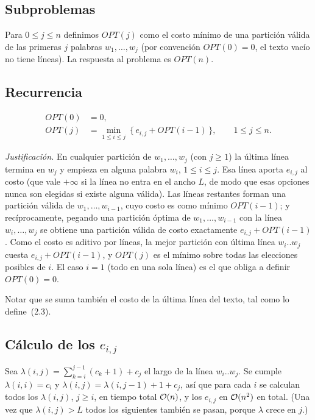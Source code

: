 \subsection*{Subproblemas}

Para $0\le j\le n$ definimos $OPT(j)$ como el costo mínimo de una partición válida de las primeras $j$ palabras $w_1,\dots,w_j$ (por convención $OPT(0)=0$, el texto vacío no tiene líneas). La respuesta al problema es $OPT(n)$.

\subsection*{Recurrencia}

\begin{align}
OPT(0) &= 0, \label{e2:b}\\
OPT(j) &= \min_{1\le i\le j}\ \bigl\{\, e_{i,j} + OPT(i-1) \,\bigr\}, \qquad 1\le j\le n. \label{e2:rec}
\end{align}

\emph{Justificación.} En cualquier partición de $w_1,\dots,w_j$ (con $j\ge 1$) la última línea termina en $w_j$ y empieza en alguna palabra $w_i$, $1\le i\le j$. Esa línea aporta $e_{i,j}$ al costo (que vale $+\infty$ si la línea no entra en el ancho $L$, de modo que esas opciones nunca son elegidas si existe alguna válida). Las líneas restantes forman una partición válida de $w_1,\dots,w_{i-1}$, cuyo costo es como mínimo $OPT(i-1)$; y recíprocamente, pegando una partición óptima de $w_1,\dots,w_{i-1}$ con la línea $w_i,\dots,w_j$ se obtiene una partición válida de costo exactamente $e_{i,j}+OPT(i-1)$. Como el costo es aditivo por líneas, la mejor partición con última línea $w_i..w_j$ cuesta $e_{i,j}+OPT(i-1)$, y $OPT(j)$ es el mínimo sobre todas las elecciones posibles de $i$. El caso $i=1$ (todo en una sola línea) es el que obliga a definir $OPT(0)=0$.

Notar que se suma también el costo de la última línea del texto, tal como lo define~(2.3).

\subsection*{Cálculo de los $e_{i,j}$}

Sea $\lambda(i,j)=\sum_{k=i}^{j-1}(c_k+1)+c_j$ el largo de la línea $w_i..w_j$. Se cumple $\lambda(i,i)=c_i$ y $\lambda(i,j)=\lambda(i,j-1)+1+c_j$, así que para cada $i$ se calculan todos los $\lambda(i,j)$, $j\ge i$, en tiempo total $\mathcal{O}(n)$, y los $e_{i,j}$ en $\mathcal{O}(n^2)$ en total. (Una vez que $\lambda(i,j)>L$ todos los siguientes también se pasan, porque $\lambda$ crece en $j$.)

